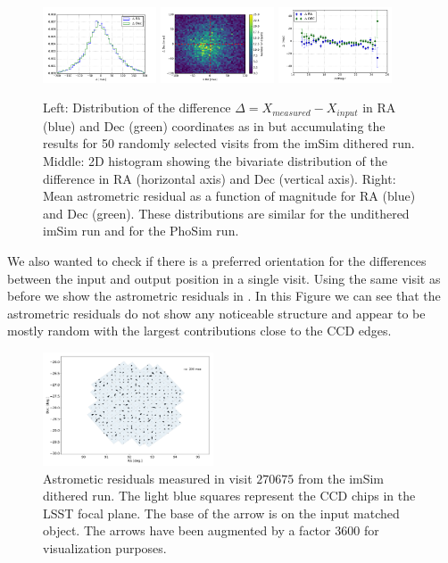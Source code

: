 \documentclass[\docopts]{\docclass}
\begin{document}
\begin{figure}
  \centering
  \includegraphics[width=0.3\textwidth]{astrometry_imsim_dithered_50visits}
  \includegraphics[width=0.3\textwidth]{astrometry_imsim_dithered_50visits_hist2d}
  \includegraphics[width=0.3\textwidth]{astrometry_vs_mag_imsim_50_visits}
  \caption{Left: Distribution of the difference $\Delta=X_{measured}-X_{input}$ in RA (blue) and Dec (green) coordinates as in
   but accumulating the results for 50 randomly selected visits from the imSim dithered run. Middle: 2D histogram
  showing the bivariate distribution of the difference in RA (horizontal axis) and Dec (vertical axis). Right: Mean astrometric residual
  as a function of magnitude for RA (blue) and Dec (green). These distributions are similar for the undithered imSim run and for the PhoSim run.}
  \label{fig:astrometry_b}
\end{figure}

We also wanted to check if there is a preferred orientation for the differences between the input and output position in a single visit. Using the same visit as before we show the astrometric residuals in . In this Figure we can see that the astrometric residuals do not show any noticeable structure and appear to be mostly random with the largest contributions close to the CCD edges.

\begin{figure}
  \centering
  \includegraphics[width=0.45\textwidth]{astrometry_imsim_dithered_interp}
  \caption{Astrometic residuals measured in visit $270675$ from the imSim dithered run. The light blue squares represent the CCD chips in
  the LSST focal plane. The base of the arrow is on the input matched object. The arrows have been augmented by a factor 3600 for visualization purposes.}
  \label{fig:astrometry_c}
\end{figure}
\end{document}
